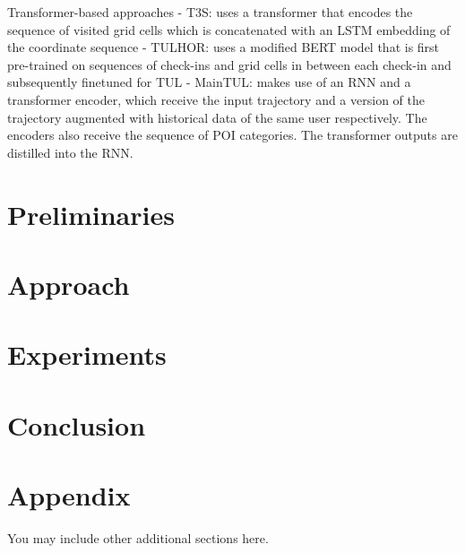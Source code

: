 \documentclass{article} %
\begin{document}
Transformer-based approaches
- T3S: uses a transformer that encodes the sequence of visited grid cells which is concatenated with an LSTM embedding of the coordinate sequence
- TULHOR: uses a modified BERT model that is first pre-trained on sequences of check-ins and grid cells in between each check-in and subsequently finetuned for TUL
- MainTUL: makes use of an RNN and a transformer encoder, which receive the input trajectory and a version of the trajectory augmented with historical data of the same user respectively. The encoders also receive the sequence of POI categories. The transformer outputs are distilled into the RNN.



\section{Preliminaries}

\section{Approach}

\section{Experiments}

\section{Conclusion}






\appendix
\section{Appendix}
You may include other additional sections here.
\end{document}
